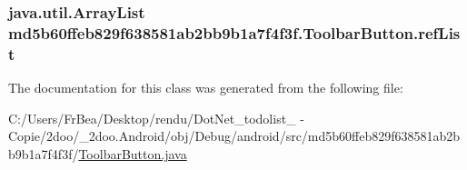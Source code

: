 \hypertarget{classmd5b60ffeb829f638581ab2bb9b1a7f4f3f_1_1_toolbar_button_fa96144f45d698d61368958ea346709a}{
\subsubsection[{refList}]{\setlength{\rightskip}{0pt plus 5cm}java.util.ArrayList {\bf md5b60ffeb829f638581ab2bb9b1a7f4f3f.ToolbarButton.refList}}}
\label{classmd5b60ffeb829f638581ab2bb9b1a7f4f3f_1_1_toolbar_button_fa96144f45d698d61368958ea346709a}




The documentation for this class was generated from the following file:\begin{CompactItemize}
\item 
C:/Users/FrBea/Desktop/rendu/DotNet\_\-todolist\_ - Copie/2doo/\_\-2doo.Android/obj/Debug/android/src/md5b60ffeb829f638581ab2bb9b1a7f4f3f/\hyperlink{_toolbar_button_8java}{ToolbarButton.java}\end{CompactItemize}
